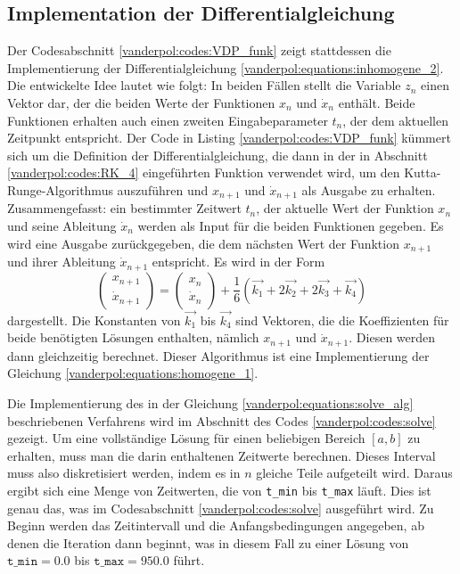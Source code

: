 \subsection{Implementation der Differentialgleichung
\label{vanderpol:subsection:diff}}
Der Codesabschnitt \ref{vanderpol:codes:VDP_funk} zeigt stattdessen die Implementierung der Differentialgleichung \eqref{vanderpol:equations:inhomogene_2}. Die entwickelte Idee lautet wie folgt: In beiden Fällen stellt die Variable $z_n$ einen Vektor dar, der die beiden Werte der Funktionen $x_n$ und $\dot{x}_n$ enthält. Beide Funktionen erhalten auch einen zweiten Eingabeparameter $t_n$, der dem aktuellen Zeitpunkt entspricht. Der Code in Listing \ref{vanderpol:codes:VDP_funk} kümmert sich um die Definition der Differentialgleichung, die dann in der in Abschnitt \ref{vanderpol:codes:RK_4} eingeführten Funktion verwendet wird, um den Kutta-Runge-Algorithmus auszuführen und $x_{n+1}$ und $\dot{x}_{n+1}$ als Ausgabe zu erhalten. Zusammengefasst: ein bestimmter Zeitwert $t_n$, der aktuelle Wert der Funktion $x_{n}$ und seine Ableitung $\dot{x}_{n}$ werden als Input für die beiden Funktionen gegeben. Es wird eine Ausgabe zurückgegeben, die dem nächsten Wert der Funktion $x_{n+1}$ und ihrer Ableitung $\dot{x}_{n+1}$ entspricht. Es wird in der Form
\begin{equation}
\begin{pmatrix}x_{n+1} \\ \dot{x}_{n+1} \end{pmatrix} = \begin{pmatrix}x_{n} \\ \dot{x}_{n} \end{pmatrix} + \frac{1}{6}(\vec{k_1} + 2\vec{k_2} + 2\vec{k_3} + \vec{k_4})
\label{vanderpol:equations:solve_alg}
\end{equation}
dargestellt. Die Konstanten von $\vec{k_1}$ bis $\vec{k_4}$ sind Vektoren, die die Koeffizienten für beide benötigten Lösungen enthalten, nämlich $x_{n+1}$ und $\dot{x}_{n+1}$.
Diesen werden dann gleichzeitig berechnet. Dieser Algorithmus ist eine Implementierung der Gleichung \eqref{vanderpol:equations:homogene_1}.

Die Implementierung des in der Gleichung \eqref{vanderpol:equations:solve_alg} beschriebenen Verfahrens wird im Abschnitt des Codes \ref{vanderpol:codes:solve} gezeigt.
Um eine vollständige Lösung für einen beliebigen Bereich $[a, b]$ zu erhalten, muss man die darin enthaltenen Zeitwerte berechnen. Dieses Interval muss also diskretisiert werden, indem es in $n$ gleiche Teile aufgeteilt wird. Daraus ergibt sich eine Menge von Zeitwerten, die von \texttt{t\_min} bis \texttt{t\_max} läuft.
Dies ist genau das, was im Codesabschnitt \ref{vanderpol:codes:solve} ausgeführt wird. Zu Beginn werden das Zeitintervall und die Anfangsbedingungen angegeben, ab denen die Iteration dann beginnt, was in diesem Fall zu einer Lösung von $\texttt{t\_min}=0.0$ bis $\texttt{t\_max}=950.0$ führt.